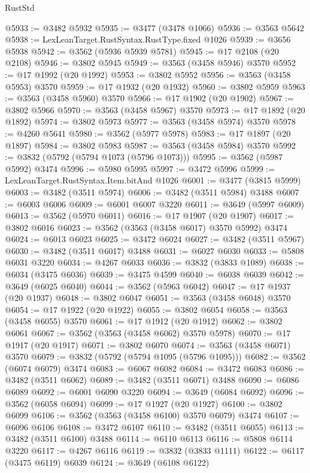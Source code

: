 \begin{lexlean}{RustStd}
\begin{coremodule}
@5933 := @3482 @5932
@5935 := @3477 (@3478 @1066)
@5936 := @3563 @5642
@5938 := LexLeanTarget.RustSyntax.RustType.fixed @1026
@5939 := @3656 @5938
@5942 := @3562 (@5936 @5939 @5781)
@5945 := @17 @2108 (@20 @2108)
@5946 := @3802 @5945
@5949 := @3563 (@3458 @5946) @3570
@5952 := @17 @1992 (@20 @1992)
@5953 := @3802 @5952
@5956 := @3563 (@3458 @5953) @3570
@5959 := @17 @1932 (@20 @1932)
@5960 := @3802 @5959
@5963 := @3563 (@3458 @5960) @3570
@5966 := @17 @1902 (@20 @1902)
@5967 := @3802 @5966
@5970 := @3563 (@3458 @5967) @3570
@5973 := @17 @1892 (@20 @1892)
@5974 := @3802 @5973
@5977 := @3563 (@3458 @5974) @3570
@5978 := @4260 @5641
@5980 := @3562 (@5977 @5978)
@5983 := @17 @1897 (@20 @1897)
@5984 := @3802 @5983
@5987 := @3563 (@3458 @5984) @3570
@5992 := @3832 (@5792 (@5794 @1073 (@5796 @1073)))
@5995 := @3562 (@5987 @5992) @3474
@5996 := @5980 @5995
@5997 := @3472 @5996
@5999 := LexLeanTarget.RustSyntax.Item.bitAnd @1026
@6001 := @3477 (@3815 @5999)
@6003 := @3482 (@3511 @5974)
@6006 := @3482 (@3511 @5984) @3488
@6007 := @6003 @6006
@6009 := @6001 @6007 @3220
@6011 := @3649 (@5997 @6009)
@6013 := @3562 (@5970 @6011)
@6016 := @17 @1907 (@20 @1907)
@6017 := @3802 @6016
@6023 := @3562 (@3563 (@3458 @6017) @3570 @5992) @3474
@6024 := @6013 @6023
@6025 := @3472 @6024
@6027 := @3482 (@3511 @5967)
@6030 := @3482 (@3511 @6017) @3488
@6031 := @6027 @6030
@6033 := @5808 @6031 @3220
@6034 := @4267 @6033
@6036 := @3832 (@3833 @1089)
@6038 := @6034 (@3475 @6036)
@6039 := @3475 @4599
@6040 := @6038 @6039
@6042 := @3649 (@6025 @6040)
@6044 := @3562 (@5963 @6042)
@6047 := @17 @1937 (@20 @1937)
@6048 := @3802 @6047
@6051 := @3563 (@3458 @6048) @3570
@6054 := @17 @1922 (@20 @1922)
@6055 := @3802 @6054
@6058 := @3563 (@3458 @6055) @3570
@6061 := @17 @1912 (@20 @1912)
@6062 := @3802 @6061
@6067 := @3562 (@3563 (@3458 @6062) @3570 @5978)
@6070 := @17 @1917 (@20 @1917)
@6071 := @3802 @6070
@6074 := @3563 (@3458 @6071) @3570
@6079 := @3832 (@5792 (@5794 @1095 (@5796 @1095)))
@6082 := @3562 (@6074 @6079) @3474
@6083 := @6067 @6082
@6084 := @3472 @6083
@6086 := @3482 (@3511 @6062)
@6089 := @3482 (@3511 @6071) @3488
@6090 := @6086 @6089
@6092 := @6001 @6090 @3220
@6094 := @3649 (@6084 @6092)
@6096 := @3562 (@6058 @6094)
@6099 := @17 @1927 (@20 @1927)
@6100 := @3802 @6099
@6106 := @3562 (@3563 (@3458 @6100) @3570 @6079) @3474
@6107 := @6096 @6106
@6108 := @3472 @6107
@6110 := @3482 (@3511 @6055)
@6113 := @3482 (@3511 @6100) @3488
@6114 := @6110 @6113
@6116 := @5808 @6114 @3220
@6117 := @4267 @6116
@6119 := @3832 (@3833 @1111)
@6122 := @6117 (@3475 @6119) @6039
@6124 := @3649 (@6108 @6122)

\end{coremodule}
\end{lexlean}
